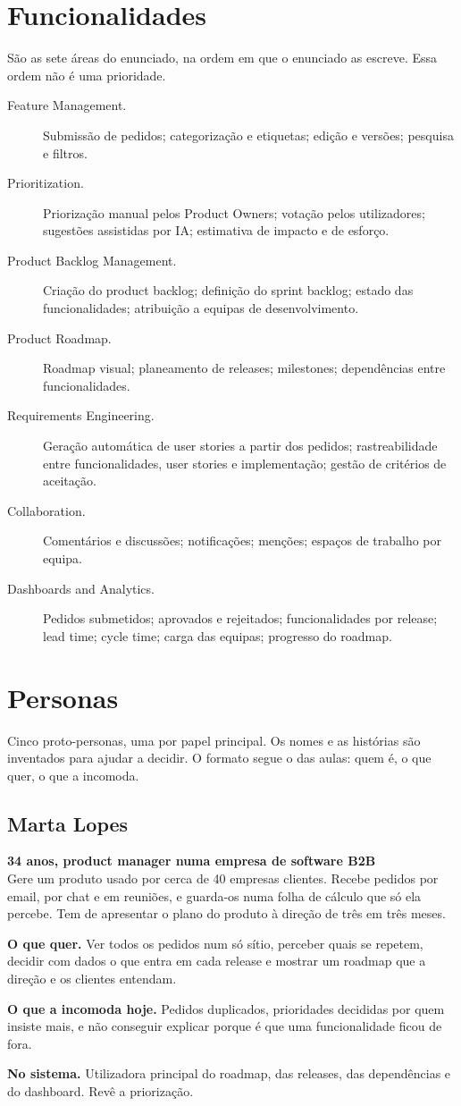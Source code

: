 \documentclass[12pt,a4paper]{article}
\newcommand{\persona}[6]{%
  \subsection{#1}
  \textbf{#2}\\
  #3

  \textbf{O que quer.} #4

  \textbf{O que a incomoda hoje.} #5

  \textbf{No sistema.} #6
}
\begin{document}
\section{Funcionalidades}

São as sete áreas do enunciado, na ordem em que o enunciado as escreve. Essa ordem não é uma prioridade.

\begin{description}
\item[Feature Management.] Submissão de pedidos; categorização e etiquetas; edição e versões; pesquisa e filtros.
\item[Prioritization.] Priorização manual pelos Product Owners; votação pelos utilizadores; sugestões assistidas por IA; estimativa de impacto e de esforço.
\item[Product Backlog Management.] Criação do product backlog; definição do sprint backlog; estado das funcionalidades; atribuição a equipas de desenvolvimento.
\item[Product Roadmap.] Roadmap visual; planeamento de releases; milestones; dependências entre funcionalidades.
\item[Requirements Engineering.] Geração automática de user stories a partir dos pedidos; rastreabilidade entre funcionalidades, user stories e implementação; gestão de critérios de aceitação.
\item[Collaboration.] Comentários e discussões; notificações; menções; espaços de trabalho por equipa.
\item[Dashboards and Analytics.] Pedidos submetidos; aprovados e rejeitados; funcionalidades por release; lead time; cycle time; carga das equipas; progresso do roadmap.
\end{description}

\section{Personas}

Cinco proto-personas, uma por papel principal. Os nomes e as histórias são inventados para ajudar a decidir. O formato segue o das aulas: quem é, o que quer, o que a incomoda.

\persona{Marta Lopes}{34 anos, product manager numa empresa de software B2B}
{Gere um produto usado por cerca de 40 empresas clientes. Recebe pedidos por email, por chat e em reuniões, e guarda-os numa folha de cálculo que só ela percebe. Tem de apresentar o plano do produto à direção de três em três meses.}
{Ver todos os pedidos num só sítio, perceber quais se repetem, decidir com dados o que entra em cada release e mostrar um roadmap que a direção e os clientes entendam.}
{Pedidos duplicados, prioridades decididas por quem insiste mais, e não conseguir explicar porque é que uma funcionalidade ficou de fora.}
{Utilizadora principal do roadmap, das releases, das dependências e do dashboard. Revê a priorização.}
\end{document}
